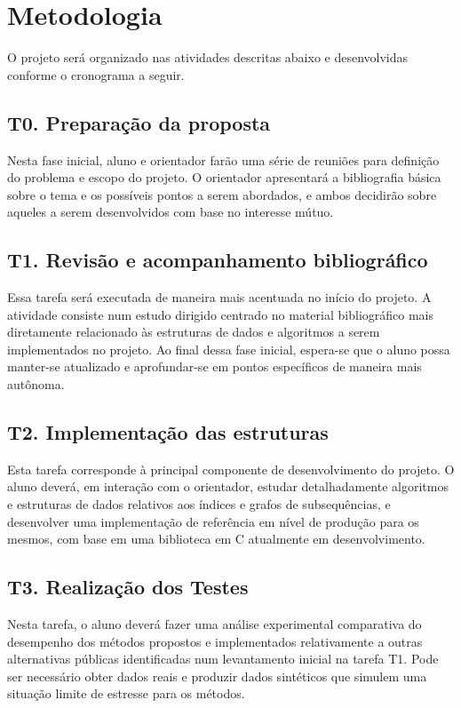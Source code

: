\documentclass[12pt, a4paper, oneside]{article}
\begin{document}
\clearpage
\section{Metodologia}

O projeto será organizado nas atividades descritas abaixo e desenvolvidas conforme o cronograma a seguir.

\subsection{T0. Preparação da proposta}

Nesta fase inicial, aluno e orientador farão uma série de reuniões para definição do problema e escopo do projeto. O orientador apresentará a bibliografia básica sobre o tema e os possíveis pontos a serem abordados, e ambos decidirão sobre aqueles a serem desenvolvidos com base no  interesse mútuo.

\subsection{T1. Revisão e acompanhamento bibliográfico}

Essa tarefa será executada de maneira mais acentuada no início do projeto. A atividade consiste num estudo dirigido centrado no  material bibliográfico mais diretamente relacionado às estruturas de dados e algoritmos a serem implementados no projeto. Ao final dessa fase inicial, espera-se que o aluno possa manter-se atualizado e aprofundar-se em pontos específicos de maneira mais autônoma.


\subsection{T2. Implementação das estruturas}

Esta tarefa corresponde à principal componente de desenvolvimento do projeto. O aluno deverá, em interação com o orientador, estudar detalhadamente algoritmos e estruturas de dados relativos aos índices e grafos de subsequências, e desenvolver uma implementação de referência em nível de produção para os mesmos, com base em uma biblioteca em C atualmente em desenvolvimento.


\subsection{T3. Realização dos Testes}

Nesta tarefa, o aluno deverá fazer uma análise experimental comparativa do desempenho dos métodos propostos e implementados relativamente a outras alternativas públicas identificadas num levantamento inicial na tarefa T1. Pode ser necessário obter dados reais e produzir dados sintéticos que simulem uma situação limite de estresse para os métodos.
\end{document}
